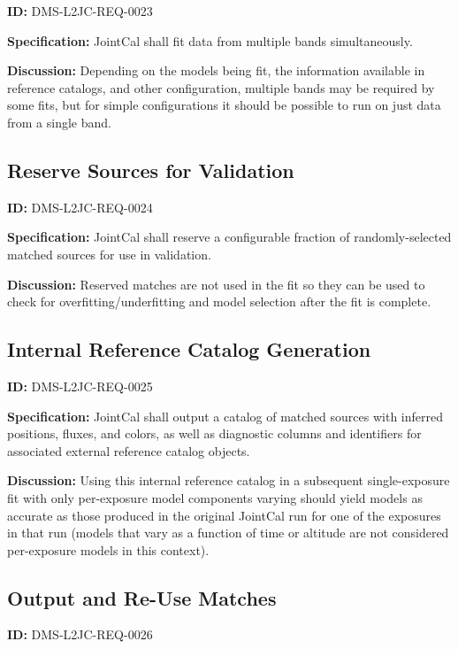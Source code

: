 \documentclass[SE,toc,lsstdraft]{lsstdoc}
\begin{document}
\label{DMS-L2JC-REQ-0023}
\textbf{ID:} DMS-L2JC-REQ-0023

\textbf{Specification:}
JointCal shall fit data from multiple bands simultaneously.

\textbf{Discussion:}
Depending on the models being fit, the information available in reference catalogs, and other configuration, multiple bands may be required by some fits, but for simple configurations it should be possible to run on just data from a single band.

\subsection{Reserve Sources for Validation}

\label{DMS-L2JC-REQ-0024}
\textbf{ID:} DMS-L2JC-REQ-0024

\textbf{Specification:}
JointCal shall reserve a configurable fraction of randomly-selected matched sources for use in validation.

\textbf{Discussion:}
Reserved matches are not used in the fit so they can be used to check for overfitting/underfitting and model selection after the fit is complete.

\subsection{Internal Reference Catalog Generation}

\label{DMS-L2JC-REQ-0025}
\textbf{ID:} DMS-L2JC-REQ-0025

\textbf{Specification:}
JointCal shall output a catalog of matched sources with inferred positions, fluxes, and colors, as well as diagnostic columns and identifiers for associated external reference catalog objects.

\textbf{Discussion:}
Using this internal reference catalog in a subsequent single-exposure fit with only per-exposure model components varying should yield models as accurate as those produced in the original JointCal run for one of the exposures in that run (models that vary as a function of time or altitude are not considered per-exposure models in this context).

\subsection{Output and Re-Use Matches}

\label{DMS-L2JC-REQ-0026}
\textbf{ID:} DMS-L2JC-REQ-0026
\end{document}
